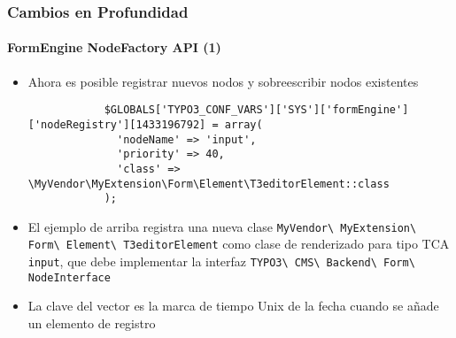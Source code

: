 \begin{frame}[fragile]
	\frametitle{Cambios en Profundidad}
	\framesubtitle{FormEngine NodeFactory API (1)}

	\lstset{basicstyle=\tiny\ttfamily}

	\begin{itemize}

		\item Ahora es posible registrar nuevos nodos y sobreescribir nodos existentes

		\begin{lstlisting}
			$GLOBALS['TYPO3_CONF_VARS']['SYS']['formEngine']['nodeRegistry'][1433196792] = array(
			  'nodeName' => 'input',
			  'priority' => 40,
			  'class' => \MyVendor\MyExtension\Form\Element\T3editorElement::class
			);
		\end{lstlisting}

		\item El ejemplo de arriba registra una nueva clase
			\texttt{MyVendor\textbackslash
				MyExtension\textbackslash
				Form\textbackslash
				Element\textbackslash
				T3editorElement}
			como clase de renderizado para tipo TCA \texttt{input}, que debe implementar la interfaz
			\texttt{TYPO3\textbackslash
				CMS\textbackslash
				Backend\textbackslash
				Form\textbackslash
				NodeInterface}

		\item La clave del vector es la marca de tiempo Unix de la fecha cuando se añade un elemento de registro

	\end{itemize}

\end{frame}


